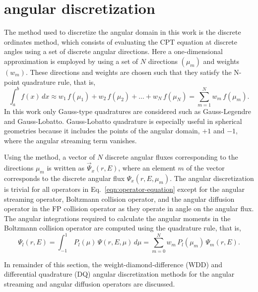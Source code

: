 \section{\Sn angular discretization}
The method used to discretize the angular domain in this work is the discrete ordinates method, which consists of evaluating the CPT equation at discrete angles using a set of discrete angular directions. Here a one-dimensional \Sn approximation is employed by using a set of $N$ directions $(\mu_m)$ and weights $(w_m)$. These directions and weights are chosen such that they satisfy the N-point quadrature rule, that is,
\begin{equation}
    \int_{a}^b f(x) \, dx \approx w_1 \, f(\mu_1) + w_2 \, f(\mu_2) + \ldots + w_N \, f(\mu_N) = \sum_{m=1}^N w_{m} \, f(\mu_m).
\end{equation}
In this work only Gauss-type quadratures are considered such as Gauss-Legendre and Gauss-Lobatto. Gauss-Lobatto quadrature is especially useful in spherical geometries because it includes the points of the angular domain, $+1$ and $-1$, where the angular streaming term vanishes. 

Using the \Sn method, a vector of $N$ discrete angular fluxes corresponding to the directions $\mu_m$ is written as $\vec{\Psi}_x(r,E)$, where an element $m$ of the vector corresponds to the discrete angular flux $\Psi_x(r,E,\mu_m)$. The angular discretization is trivial for all operators in Eq.~\eqref{eqn:operator-equation} except for the angular streaming operator, Boltzmann collision operator, and the angular diffusion operator in the FP collision operator as they operate in angle on the angular flux. The angular integrations required to calculate the angular moments in the Boltzmann collision operator are computed using the quadrature rule, that is,
\begin{equation}
    \Psi_l(r,E) = \int_{-1}^1 \, P_l(\mu) \, \Psi(r,E,\mu) \, d\mu = \sum_{m=0}^N w_m \, P_l(\mu_m) \, \Psi_m(r,E).
\end{equation} 

In remainder of this section, the weight-diamond-difference (WDD) and differential quadrature (DQ) angular discretization methods for the angular streaming and angular diffusion operators are discussed. 

